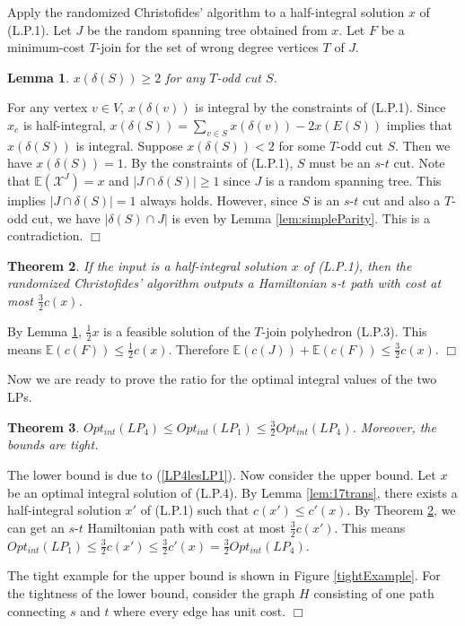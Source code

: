 \documentclass[11pt]{article}
\newcommand{\qed}{\hspace*{\fill}$\Box$}
\newtheorem{theorem}{Theorem}[section]
\newtheorem{lemma}[theorem]{Lemma}
\newenvironment{proof}[1][Proof. ]{\noindent {\bf #1 }}{\qed}
\begin{document}
Apply the randomized Christofides' algorithm to a half-integral
solution $x$ of (L.P.1). Let $J$ be the random spanning tree obtained
from $x$. Let $F$ be a minimum-cost $T$-join for the set of wrong degree
vertices $T$ of $J$.

\begin{lemma}\label{lem:fea-half}
$x(\delta(S))\geq 2$ for any  $T$-odd cut $S$.
\end{lemma}
\begin{proof}
For any vertex $v\in V$, $x(\delta(v))$ is integral by
the constraints of (L.P.1).
Since $x_e$ is half-integral, $x(\delta(S))=\sum_{v\in S}
x(\delta(v))-2x(E(S))$ implies that $x(\delta(S))$ is integral.
Suppose $x(\delta(S))<2$ for some $T$-odd cut $S$. Then we have
$x(\delta(S))=1$. By the constraints of (L.P.1), $S$ must be an
$s$-$t$ cut. Note that $\mathbb{E}(\mathcal{X}^J)=x$ and $|J\cap \delta(S)|
\geq 1$ since $J$ is a random spanning tree. This implies $|J\cap
\delta(S)|=1$ always holds. However, since $S$ is an $s$-$t$ cut and
also a $T$-odd cut, we have $|\delta(S)\cap J|$ is even by Lemma \ref{lem:simpleParity}. This is a contradiction.
\end{proof}

\begin{theorem}\label{halfAlgorithm}
If the input is a half-integral solution $x$ of (L.P.1), then the
randomized Christofides' algorithm outputs a Hamiltonian $s$-$t$
path with cost at most $\frac{3}{2}c(x)$.
\end{theorem}
\begin{proof}
By Lemma \ref{lem:fea-half}, $\frac{1}{2}x$ is a feasible solution
of the $T$-join polyhedron (L.P.3).
This means $\mathbb{E}(c(F))\leq \frac{1}{2}c(x)$.
Therefore $\mathbb{E}(c(J))+\mathbb{E}(c(F))\leq \frac{3}{2}c(x)$.
\end{proof}

\medskip

Now we are ready to prove the ratio for the optimal integral values
of the two LPs.

\begin{theorem}\label{equivLP41}
$Opt_{int}(LP_4)\leq Opt_{int}(LP_1)\leq \frac{3}{2}Opt_{int}(LP_4)$.
Moreover, the bounds are tight.
\end{theorem}
\begin{proof}
The lower bound is due to (\ref{LP4lesLP1}). Now consider the upper
bound.  Let $x$ be an optimal integral solution of (L.P.4). By
Lemma \ref{lem:17trans}, there exists a half-integral solution $x'$
of (L.P.1) such that $c(x')\leq c'(x)$. By Theorem \ref{halfAlgorithm},
we can get an $s$-$t$ Hamiltonian path with cost at most $\frac{3}{2}c(x')$.
This means $Opt_{int}(LP_1)\leq \frac{3}{2}c(x')\leq
\frac{3}{2}c'(x)=\frac{3}{2}Opt_{int}(LP_4)$.

The tight example for the upper bound is shown in Figure
\ref{tightExample}. For the tightness of the lower bound, consider
the graph $H$ consisting of one path connecting $s$ and $t$ where
every edge has unit cost.
\end{proof}
\end{document}
